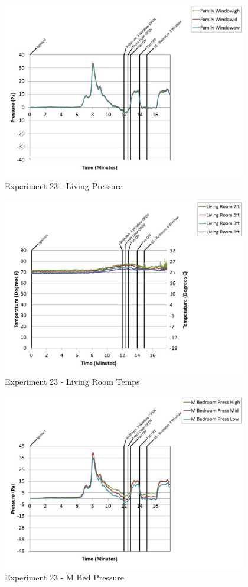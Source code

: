 \documentclass{article}
\begin{document}
\begin{appendices}
	\clearpage

	\begin{figure}[h!]
		\centering
		\includegraphics[height=3.05in]{0_Images/Results_Charts/Exp_23_Charts/LivingPressure.pdf}
		\caption{Experiment 23 - Living Pressure}
	\end{figure}
 

	\begin{figure}[h!]
		\centering
		\includegraphics[height=3.05in]{0_Images/Results_Charts/Exp_23_Charts/LivingRoomTemps.pdf}
		\caption{Experiment 23 - Living Room Temps}
	\end{figure}
 
	\clearpage

	\begin{figure}[h!]
		\centering
		\includegraphics[height=3.05in]{0_Images/Results_Charts/Exp_23_Charts/MBedPressure.pdf}
		\caption{Experiment 23 - M Bed Pressure}
	\end{figure}
 


\end{appendices}
\end{document}
